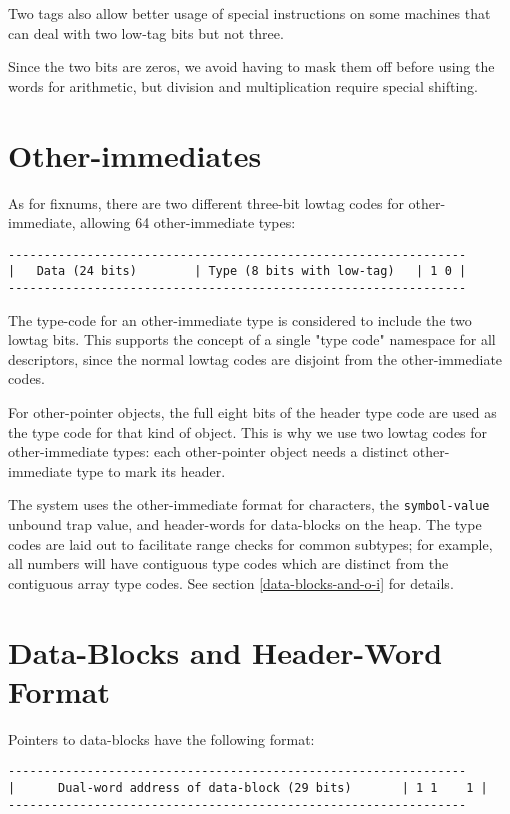 Two tags also allow better usage of special instructions on some machines that
can deal with two low-tag bits but not three.

Since the two bits are zeros, we avoid having to mask them off before using the
words for arithmetic, but division and multiplication require special shifting.



\section{Other-immediates}

As for fixnums, there are two different three-bit lowtag codes for
other-immediate, allowing 64 other-immediate types:
\begin{verbatim}
----------------------------------------------------------------
|   Data (24 bits)        | Type (8 bits with low-tag)   | 1 0 |
----------------------------------------------------------------
\end{verbatim}

The type-code for an other-immediate type is considered to include the two
lowtag bits.  This supports the concept of a single "type code" namespace for
all descriptors, since the normal lowtag codes are disjoint from the
other-immediate codes.

For other-pointer objects, the full eight bits of the header type code are used
as the type code for that kind of object.  This is why we use two lowtag codes
for other-immediate types: each other-pointer object needs a distinct
other-immediate type to mark its header.

The system uses the other-immediate format for characters, 
the {\tt symbol-value} unbound trap value, and header-words for data-blocks on
the heap.  The type codes are laid out to facilitate range checks for common
subtypes; for example, all numbers will have contiguous type codes which are
distinct from the contiguous array type codes.  See section
\ref{data-blocks-and-o-i} for details.


\section{Data-Blocks and Header-Word Format}

Pointers to data-blocks have the following format:
\begin{verbatim}
----------------------------------------------------------------
|      Dual-word address of data-block (29 bits)       | 1 1    1 |
----------------------------------------------------------------
\end{verbatim}

